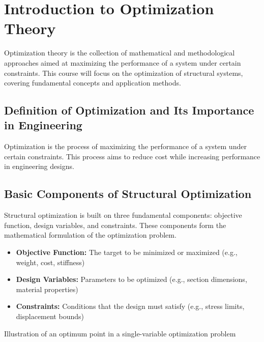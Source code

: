 \section{Introduction to Optimization Theory}
Optimization theory is the collection of mathematical and methodological approaches aimed at maximizing the performance of a system under certain constraints. This course will focus on the optimization of structural systems, covering fundamental concepts and application methods.

\subsection{Definition of Optimization and Its Importance in Engineering}
Optimization is the process of maximizing the performance of a system under certain constraints.  This process aims to reduce cost while increasing performance in engineering designs.


\subsection{Basic Components of Structural Optimization}
Structural optimization is built on three fundamental components: objective function, design variables, and constraints. These components form the mathematical formulation of the optimization problem.

\begin{itemize}
    \item \textbf{Objective Function:} The target to be minimized or maximized (e.g., weight, cost, stiffness)
    \item \textbf{Design Variables:} Parameters to be optimized (e.g., section dimensions, material properties)
    \item \textbf{Constraints:} Conditions that the design must satisfy (e.g., stress limits, displacement bounds)
\end{itemize}

\begin{marginfigure}
\centering
{}
\caption{Illustration of an optimum point in a single-variable optimization problem}
\label{fig:single_var_opt}
\end{marginfigure}

